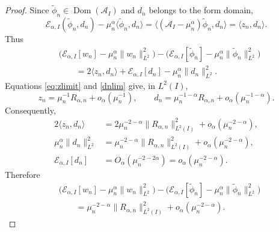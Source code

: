 \documentclass[11pt]{amsart}
\numberwithin{equation}{section}
\theoremstyle{remark}
\newcommand{\wt}{\widetilde}
\newcommand{\norm}[2][]{\lVert #2\rVert_{#1}}
\newcommand{\ip}[2]{\langle #1,#2\rangle}
\newcommand{\Dom}{\operatorname{Dom}}
\newcommand{\calE}{\mathcal E}
\begin{document}
\begin{proof}
Since $\wt\phi_n\in\Dom(\mathcal A_I)$ and $d_n$ belongs to the form domain,
\[
 \calE_{\alpha,I}(\wt\phi_n,d_n)
 -\mu_n^\alpha\ip{\wt\phi_n}{d_n}
 =\ip{(\mathcal A_I-\mu_n^\alpha)\wt\phi_n}{d_n}
 =\ip{z_n}{d_n}.
\]
Thus
\[
 \begin{aligned}
 &\bigl(\calE_{\alpha,I}[w_n]
 -\mu_n^\alpha\norm[L^2]{w_n}^2\bigr)
 -\bigl(\calE_{\alpha,I}[\wt\phi_n]
 -\mu_n^\alpha\norm[L^2]{\wt\phi_n}^2\bigr)\\
 &\qquad=2\ip{z_n}{d_n}+\calE_{\alpha,I}[d_n]
 -\mu_n^\alpha\norm[L^2]{d_n}^2.
 \end{aligned}
\]
Equations \eqref{eq:zlimit} and \eqref{dnlim} give, in $L^2(I)$,
\[
 z_n=\mu_n^{-1}R_{\alpha,n}+o_\alpha(\mu_n^{-1}),
 \qquad
 d_n=\mu_n^{-1-\alpha}R_{\alpha,n}
 +o_\alpha(\mu_n^{-1-\alpha}).
\]
Consequently,
\[
 \begin{aligned}
 2\ip{z_n}{d_n}
 &=2\mu_n^{-2-\alpha}\norm[L^2(I)]{R_{\alpha,n}}^2
 +o_\alpha(\mu_n^{-2-\alpha}),\\
 \mu_n^\alpha\norm[L^2]{d_n}^2
 &=\mu_n^{-2-\alpha}\norm[L^2(I)]{R_{\alpha,n}}^2
 +o_\alpha(\mu_n^{-2-\alpha}),\\
 \calE_{\alpha,I}[d_n]
 &=O_\alpha(\mu_n^{-2-2\alpha})
 =o_\alpha(\mu_n^{-2-\alpha}).
 \end{aligned}
\]
Therefore
\begin{equation}\label{eq:w-qmode-comparison}
 \begin{aligned}
 &\bigl(\calE_{\alpha,I}[w_n]
 -\mu_n^\alpha\norm[L^2]{w_n}^2\bigr)
 -\bigl(\calE_{\alpha,I}[\wt\phi_n]
 -\mu_n^\alpha\norm[L^2]{\wt\phi_n}^2\bigr)\\
 &\qquad=\mu_n^{-2-\alpha}\norm[L^2(I)]{R_{\alpha,n}}^2
 +o_\alpha(\mu_n^{-2-\alpha}).
 \end{aligned}
\end{equation}


\end{proof}
\end{document}
